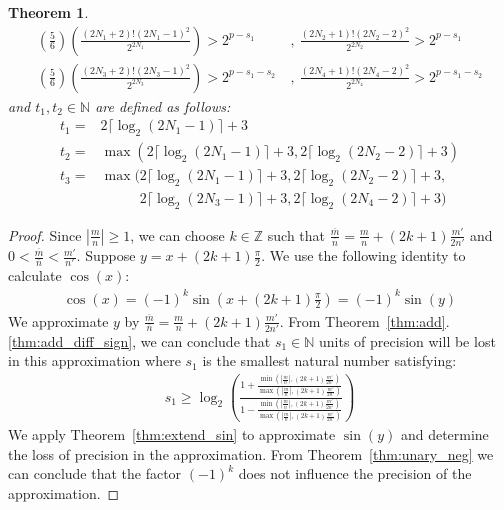 \documentclass{article}
\newcommand{\nat}{\mathbb{N}}
\newcommand{\integer}{\mathbb{Z}}
\newcommand{\om}{\overline{m}}
\newcommand{\on}{\overline{n}}
\newtheorem{mytheorem}{Theorem}
\numberwithin{mytheorem}{section}
\begin{document}
\begin{mytheorem}
\begin{align*}
(\frac{5}{6})(\frac{(2N_1+2)!(2N_1-1)^2}{2^{2N_1}})>2^{p-s_1} ~&,~\frac{(2N_2+1)!(2N_2-2)^2}{2^{2N_2}}>2^{p-s_1}\\
(\frac{5}{6})(\frac{(2N_3+2)!(2N_3-1)^2}{2^{2N_3}})>2^{p-s_1-s_2}~&,~\frac{(2N_4+1)!(2N_4-2)^2}{2^{2N_4}}>2^{p-s_1-s_2}
\end{align*}
and $t_1,t_2\in \nat$ are defined as follows:
\begin{align*}
t_1=&2\lceil\log_2(2N_1-1) \rceil+3\\
t_2=&\max(2\lceil\log_2(2N_1-1) \rceil+3,2\lceil\log_2(2N_2-2) \rceil+3)\\
t_3=&\max(2\lceil\log_2(2N_1-1) \rceil+3,2\lceil\log_2(2N_2-2) \rceil+3,\\
&\phantom{\max(} 2\lceil\log_2(2N_3-1) \rceil+3,2\lceil\log_2(2N_4-2) \rceil+3)
\end{align*}
\end{mytheorem}

\begin{proof}
Since $|\frac{m}{n}|\geq 1$, we can choose $k\in \integer$ such that $\frac{\om}{\on}=\frac{m}{n}+(2k+1)\frac{m'}{2n'}$ and $0< \frac{\om}{\on}<\frac{m'}{n'}$. Suppose $y=x+(2k+1)\frac{\pi}{2}$. We use the following identity to calculate $\cos(x)$:
\begin{align*}
\cos(x)=(-1)^k\sin(x+(2k+1)\frac{\pi}{2})=(-1)^k\sin(y)
\end{align*}
We approximate $y$ by $\frac{\om}{\on}=\frac{m}{n}+(2k+1)\frac{m'}{2n'}$. From Theorem~\ref{thm:add}.\ref{thm:add_diff_sign}, we can conclude that $s_1\in \nat$ units of precision will be lost in this approximation where $s_1$ is the smallest natural number satisfying:
\begin{align*}
s_1\geq \log_2(\frac{1+\frac{\min(|\frac{m}{n}|,(2k+1)\frac{m'}{2n'})}{\max(|\frac{m}{n}|,(2k+1)\frac{m'}{2n'})}}{1-\frac{\min(|\frac{m}{n}|,(2k+1)\frac{m'}{2n'})}{\max(|\frac{m}{n}|,(2k+1)\frac{m'}{2n'})}})
\end{align*}
We apply Theorem~\ref{thm:extend_sin} to approximate $\sin(y)$ and determine the loss of precision in the approximation. From Theorem~\ref{thm:unary_neg} we can conclude that the factor $(-1)^k$ does not influence the precision of the approximation. 
\end{proof}
\end{document}
